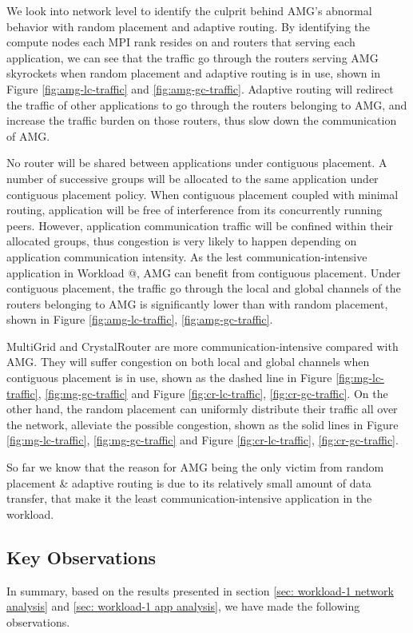 \documentclass[conference,compsoc]{IEEEtran}
\makeatletter
\newcommand{\Rmnum}[1]{\expandafter\@slowromancap\romannumeral #1@}
\makeatother
\begin{document}
We look into network level to identify the culprit behind AMG's abnormal behavior with random placement and adaptive routing. By identifying the compute nodes each MPI rank resides on and routers that serving each application, we can see that the traffic go through the routers serving AMG skyrockets when random placement and adaptive routing is in use, shown in Figure \ref{fig:amg-lc-traffic} and \ref{fig:amg-gc-traffic}. Adaptive routing will redirect the traffic of other applications to go through the routers belonging to AMG, and increase the traffic burden on those routers, thus slow down the communication of AMG.

No router will be shared between applications under contiguous placement. A number of successive groups will be allocated to the same application under contiguous placement policy. When contiguous placement coupled with minimal routing, application will be free of interference from its concurrently running peers. However, application communication traffic will be confined within their allocated groups, thus congestion is very likely to happen depending on application communication intensity. As the lest communication-intensive application in Workload \Rmnum{1}, AMG can benefit from contiguous placement. Under contiguous placement, the traffic go through the local and global channels of the routers belonging to AMG is significantly lower than with random placement, shown in Figure \ref{fig:amg-lc-traffic}, \ref{fig:amg-gc-traffic}. 

MultiGrid and CrystalRouter are more communication-intensive compared with AMG. They will suffer congestion on both local and global channels when contiguous placement is in use, shown as the dashed line in Figure \ref{fig:mg-lc-traffic}, \ref{fig:mg-gc-traffic} and Figure \ref{fig:cr-lc-traffic}, \ref{fig:cr-gc-traffic}. On the other hand, the random placement can uniformly distribute their traffic all over the network, alleviate the possible congestion, shown as the solid lines in Figure \ref{fig:mg-lc-traffic}, \ref{fig:mg-gc-traffic} and Figure \ref{fig:cr-lc-traffic}, \ref{fig:cr-gc-traffic}.


So far we know that the reason for AMG being the only victim from random placement \& adaptive routing is due to its relatively small amount of data transfer, that make it the least communication-intensive application in the workload.

\subsection{Key Observations}
In summary, based on the results presented in section \ref{sec: workload-1 network analysis} and \ref{sec: workload-1 app analysis}, we have made the following observations.
\end{document}
